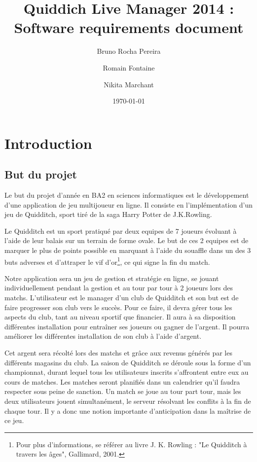 \documentclass[a4paper]{report}
\title{Quiddich Live Manager 2014 : \\Software requirements document}
\author{Bruno Rocha Pereira \and Romain Fontaine \and Nikita Marchant}
\date{\today}
\begin{document}

\maketitle
\tableofcontents
\clearpage


\chapter{Introduction}
\section{But du projet}
Le but du projet d'année en BA2 en sciences informatiques est le développement d'une application de jeu multijoueur en ligne.
Il consiste en l'implémentation d'un jeu de Quidditch, sport tiré de la saga Harry Potter de J.K.Rowling.


Le Quidditch est un sport pratiqué par deux \glspl{equipe} de 7 \glspl{joueur} évoluant à l'aide de leur balais sur un terrain de forme ovale. Le but de ces 2 \glspl{equipe} est de marquer le plus de points possible en marquant à l'aide du souaffle dans un des 3 buts adverses et d'attraper le vif d'or\footnote{Pour plus d'informations, se référer au livre J. K. Rowling : "Le Quidditch à travers les âges", Gallimard, 2001.}, ce qui signe la fin du match. 


Notre application sera un jeu de gestion et stratégie en ligne, se jouant individuellement pendant la gestion et au tour par tour à 2 joueurs lors des matchs. L'\gls{utilisateur} est le \gls{manager} d'un \gls{club} de Quidditch et son but est de faire progresser son \gls{club} vers le succès. Pour ce faire, il devra gérer tous les aspects du \gls{club}, tant au niveau sportif que financier. Il aura à sa disposition différentes installation pour entraîner ses \glspl{joueur} ou gagner de l'argent. Il pourra améliorer les différentes installation de son \gls{club} à l'aide d'argent.

Cet argent sera récolté lors des matchs et grâce aux revenus générés par les différents magasins du \gls{club}. La saison de Quidditch se déroule sous la forme d'un championnat, durant lequel tous les \glspl{utilisateur} inscrits s'affrontent entre eux au cours de matches. Les matches seront planifiés dans un calendrier qu'il faudra respecter sous peine de sanction. Un match se joue au tour part tour, mais les deux \glspl{utilisateur} jouent simultanément, le \gls{serveur} résolvant les conflits à la fin de chaque tour. Il y a donc une notion importante d'anticipation dans la maîtrise de ce jeu.
\end{document}
